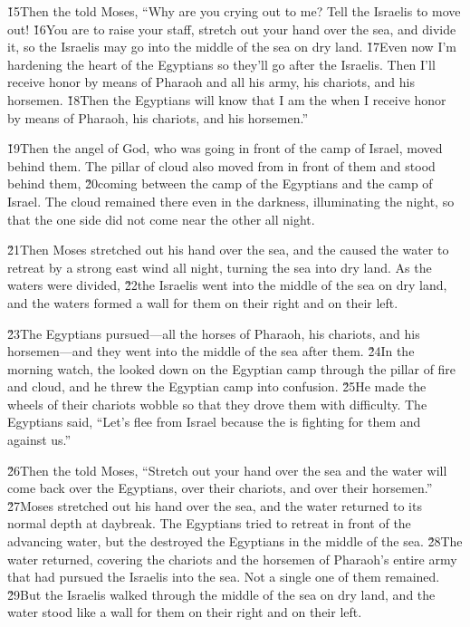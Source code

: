 \v{15}Then the  told Moses, ``Why are you crying out to me? Tell the Israelis to move out! \v{16}You are to raise your staff, stretch out your hand over the sea, and divide it, so the Israelis may go into the middle of the sea on dry land. \v{17}Even now I'm hardening the heart of the Egyptians so they'll go after the Israelis. Then I'll receive honor by means of Pharaoh and all his army, his chariots, and his horsemen. \v{18}Then the Egyptians will know that I am the  when I receive honor by means of Pharaoh, his chariots, and his horsemen.''

\v{19}Then the angel of God, who was going in front of the camp of Israel, moved behind them. The pillar of cloud also moved from in front of them and stood behind them, \v{20}coming between the camp of the Egyptians and the camp of Israel. The cloud remained there even in the darkness, illuminating the night, so that the one side did not come near the other all night.

\v{21}Then Moses stretched out his hand over the sea, and the  caused the water to retreat by a strong east wind all night, turning the sea into dry land. As the waters were divided, \v{22}the Israelis went into the middle of the sea on dry land, and the waters formed a wall for them on their right and on their left.

\v{23}The Egyptians pursued---all the horses of Pharaoh, his chariots, and his horsemen---and they went into the middle of the sea after them. \v{24}In the morning watch, the  looked down on the Egyptian camp through the pillar of fire and cloud, and he threw the Egyptian camp into confusion. \v{25}He made the wheels of their chariots wobble so that they drove them with difficulty. The Egyptians said, ``Let's flee from Israel because the  is fighting for them and against us.''

\v{26}Then the  told Moses, ``Stretch out your hand over the sea and the water will come back over the Egyptians, over their chariots, and over their horsemen.'' \v{27}Moses stretched out his hand over the sea, and the water returned to its normal depth at daybreak. The Egyptians tried to retreat in front of the advancing water, but the  destroyed the Egyptians in the middle of the sea. \v{28}The water returned, covering the chariots and the horsemen of Pharaoh's entire army that had pursued the Israelis into the sea. Not a single one of them remained. \v{29}But the Israelis walked through the middle of the sea on dry land, and the water stood like a wall for them on their right and on their left.

